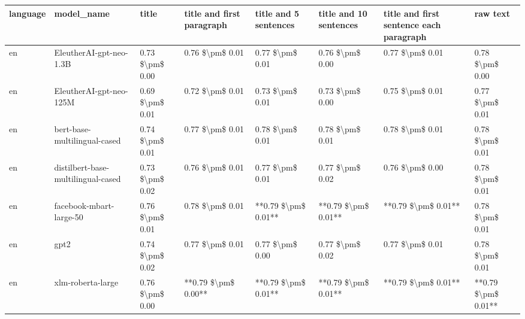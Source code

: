 \begin{tabular}{llllllll}
\toprule
language &                         model\_name &           title & title and first paragraph & title and 5 sentences & title and 10 sentences & title and first sentence each paragraph &            raw text \\
\midrule
      en &            EleutherAI-gpt-neo-1.3B & 0.73 \$\textbackslash pm\$ 0.00 &           0.76 \$\textbackslash pm\$ 0.01 &       0.77 \$\textbackslash pm\$ 0.01 &        0.76 \$\textbackslash pm\$ 0.00 &                         0.77 \$\textbackslash pm\$ 0.01 &     0.78 \$\textbackslash pm\$ 0.00 \\
      en &            EleutherAI-gpt-neo-125M & 0.69 \$\textbackslash pm\$ 0.01 &           0.72 \$\textbackslash pm\$ 0.01 &       0.73 \$\textbackslash pm\$ 0.01 &        0.73 \$\textbackslash pm\$ 0.00 &                         0.75 \$\textbackslash pm\$ 0.01 &     0.77 \$\textbackslash pm\$ 0.01 \\
      en &       bert-base-multilingual-cased & 0.74 \$\textbackslash pm\$ 0.01 &           0.77 \$\textbackslash pm\$ 0.01 &       0.78 \$\textbackslash pm\$ 0.01 &        0.78 \$\textbackslash pm\$ 0.01 &                         0.78 \$\textbackslash pm\$ 0.01 &     0.78 \$\textbackslash pm\$ 0.01 \\
      en & distilbert-base-multilingual-cased & 0.73 \$\textbackslash pm\$ 0.02 &           0.76 \$\textbackslash pm\$ 0.01 &       0.77 \$\textbackslash pm\$ 0.01 &        0.77 \$\textbackslash pm\$ 0.02 &                         0.76 \$\textbackslash pm\$ 0.00 &     0.78 \$\textbackslash pm\$ 0.01 \\
      en &            facebook-mbart-large-50 & 0.76 \$\textbackslash pm\$ 0.01 &           0.78 \$\textbackslash pm\$ 0.01 &   **0.79 \$\textbackslash pm\$ 0.01** &    **0.79 \$\textbackslash pm\$ 0.01** &                     **0.79 \$\textbackslash pm\$ 0.01** &     0.78 \$\textbackslash pm\$ 0.01 \\
      en &                               gpt2 & 0.74 \$\textbackslash pm\$ 0.02 &           0.77 \$\textbackslash pm\$ 0.01 &       0.77 \$\textbackslash pm\$ 0.00 &        0.77 \$\textbackslash pm\$ 0.02 &                         0.77 \$\textbackslash pm\$ 0.01 &     0.78 \$\textbackslash pm\$ 0.01 \\
      en &                  xlm-roberta-large & 0.76 \$\textbackslash pm\$ 0.00 &       **0.79 \$\textbackslash pm\$ 0.00** &   **0.79 \$\textbackslash pm\$ 0.01** &    **0.79 \$\textbackslash pm\$ 0.01** &                     **0.79 \$\textbackslash pm\$ 0.01** & **0.79 \$\textbackslash pm\$ 0.01** \\

\end{tabular}
